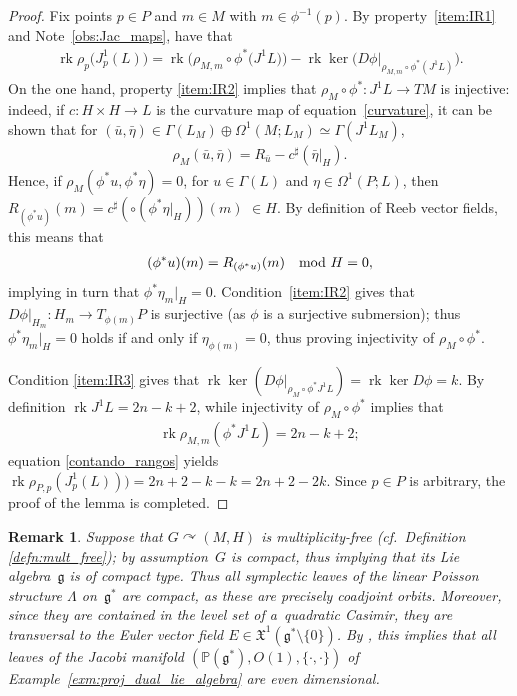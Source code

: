 \documentclass[pdftex]{sigma}
\numberwithin{equation}{section}
\newtheorem{Remark}[Theorem]{Remark} }
\newcommand{\X}{\ensuremath{\mathfrak{X}}}
\newcommand{\rank}{\operatorname{rk}} %
\newcommand{\CM}{(M,H)} %
\begin{document}
\begin{proof} Fix points $p \in P$ and $m \in M$ with $m \in \phi^{-1}(p)$. By property~\ref{item:IR1} and Note~\ref{obs:Jac_maps}, have that
\begin{gather}\label{contando_rangos}
\rank \rho_{p}\big(J_p^1(L)\big)=\rank \big(\rho_{M,m} \circ \phi^*\big(J^1L\big)\big) -\rank\ker \big(D\phi|_{\rho_{M,m}\circ\phi^*(J^1L)}\big).
\end{gather}
On the one hand, property \ref{item:IR2} implies that $\rho_M\circ\phi^* \colon J^1L \to T M$ is injective: indeed, if $c \colon H \times H \to L$ is the curvature map of equation~\eqref{curvature}, it can be shown that for $(\bar u,\bar\eta)\in\Gamma(L_M)\oplus \Omega^1(M;L_M)\simeq \Gamma(J^1L_M)$,
 \begin{gather*}
 \rho_M(\bar u,\bar\eta)=R_{\bar u}-c^\sharp(\bar\eta|_H).
 \end{gather*}
Hence, if $\rho_M(\phi^*u,\phi^*\eta)=0$, for $u\in\Gamma(L)$ and $\eta\in\Omega^1(P;L)$, then $R_{(\phi^*u)}(m)=c^\sharp(\circ(\phi^*\eta|_H))(m)$ $\in H$. By def\/inition of Reeb vector f\/ields, this means that
\begin{gather*}
 (\phi^*u)(m)=R_{(\phi^*u)}(m)\quad {\rm mod} \ H=0,
\end{gather*}
implying in turn that $\phi^*\eta_m|_H=0$. Condition~\ref{item:IR2} gives that $D\phi|_{H_m}\colon H_m\to T_{\phi(m)}P$ is surjective (as $\phi$ is a surjective submersion); thus $\phi^*\eta_m|_H=0$ holds if and only if $\eta_{\phi(m)}=0$, thus proving injectivity of $\rho_M \circ \phi^*$.

Condition \ref{item:IR3} gives that $\rank\ker (D\phi|_{\rho_M\circ\phi^*J^1L})=\rank \ker D\phi=k$. By def\/inition $\rank J^1L=2n-k+2$, while injectivity of $\rho_M \circ \phi^*$ implies that
\begin{gather*}
 \rank \rho_{M,m}(\phi^* J^1L) = 2n-k+2;
\end{gather*}
equation \eqref{contando_rangos} yields $\rank \rho_{P,p}(J_p^1(L)))=2n+2-k - k = 2n+2-2k$. Since $p \in P$ is arbitrary, the proof of the lemma is completed.
\end{proof}

\begin{Remark}\label{rk:mult_free}
Suppose that $G \curvearrowright \CM$ is multiplicity-free (cf.\ Def\/inition \ref{defn:mult_free}); by assumption~$G$ is compact, thus implying that its Lie algebra~$\mathfrak{g}$ is of compact type. Thus all symplectic leaves of the linear Poisson structure $\Lambda$ on~$\mathfrak{g}^*$ are compact, as these are precisely coadjoint orbits. Moreover, since they are contained in the level set of a~quadratic Casimir, they are transversal to the Euler vector f\/ield $E \in \X^1(\mathfrak{g}^* \setminus \{0\})$. By \cite[Remarque~2.6]{Dazord-Lich-Marle91}, this implies that all leaves of the Jacobi manifold $\left(\mathbb{P}(\mathfrak{g}^*), O(1), \{\cdot,\cdot\}\right)$ of Example~\ref{exm:proj_dual_lie_algebra} are even dimensional.
\end{Remark}
\end{document}
